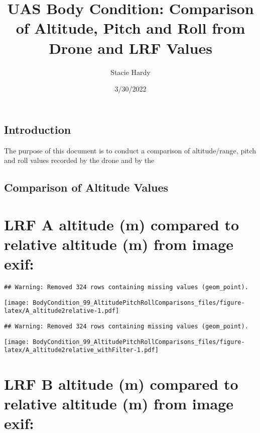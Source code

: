 \documentclass[
]{article}
\title{UAS Body Condition: Comparison of Altitude, Pitch and Roll from
Drone and LRF Values}
\author{Stacie Hardy}
\date{3/30/2022}
\begin{document}
\maketitle

\hypertarget{introduction}{%
\subsection{Introduction}\label{introduction}}

The purpose of this document is to conduct a comparison of
altitude/range, pitch and roll values recorded by the drone and by the

\hypertarget{comparison-of-altitude-values}{%
\subsection{Comparison of Altitude
Values}\label{comparison-of-altitude-values}}

\hypertarget{lrf-a-altitude-m-compared-to-relative-altitude-m-from-image-exif}{%
\section{LRF A altitude (m) compared to relative altitude (m) from image
exif:}\label{lrf-a-altitude-m-compared-to-relative-altitude-m-from-image-exif}}

\begin{verbatim}
## Warning: Removed 324 rows containing missing values (geom_point).
\end{verbatim}

\texttt{[image: BodyCondition\_99\_AltitudePitchRollComparisons\_files/figure-latex/A\_altitude2relative-1.pdf]}

\begin{verbatim}
## Warning: Removed 324 rows containing missing values (geom_point).
\end{verbatim}

\texttt{[image: BodyCondition\_99\_AltitudePitchRollComparisons\_files/figure-latex/A\_altitude2relative\_withFilter-1.pdf]}

\hypertarget{lrf-b-altitude-m-compared-to-relative-altitude-m-from-image-exif}{%
\section{LRF B altitude (m) compared to relative altitude (m) from image
exif:}\label{lrf-b-altitude-m-compared-to-relative-altitude-m-from-image-exif}}
\end{document}
